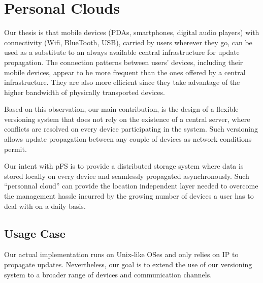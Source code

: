 


\section{Personal Clouds}
\label{sec:model}


Our thesis is that mobile devices (PDAs, smartphones, digital audio
players) with connectivity (Wifi, BlueTooth, USB), carried by users
wherever they go, can be used as a substitute to an always available
central infrastructure for update propagation. The connection patterns
between users' devices, including their mobile devices, appear to be more
frequent than the ones offered by a central infrastructure. They are
also more efficient since they take advantage of the higher bandwidth
of physically transported devices.

Based on this observation, our main contribution, is the design of a
flexible versioning system that does not rely on the existence of a
central server, where conflicts are resolved on every device
participating in the system. Such versioning allows update propagation
between any couple of devices as network conditions permit.

Our intent with pFS is to provide a distributed storage system where
data is stored locally on every device and seamlessly propagated
asynchronously. Such ``personnal cloud'' can provide the location
independent layer needed to overcome the management hassle incurred by
the growing number of devices a user has to deal with on a daily
basis.

\subsection{Usage Case}

Our actual implementation runs on Unix-like OSes and only relies on IP
to propagate updates. Nevertheless, our goal is to extend the use of
our versioning system to a broader range of devices and communication
channels.

